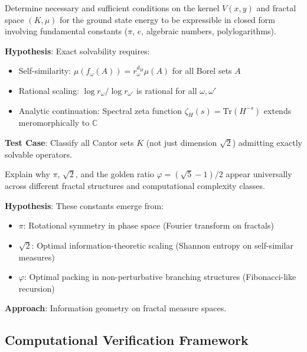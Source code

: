 \begin{problem}\label{prob:exact-solvability}
Determine necessary and sufficient conditions on the kernel $V(x,y)$ and fractal space $(K,\mu)$ for the ground state energy to be expressible in closed form involving fundamental constants ($\pi$, $e$, algebraic numbers, polylogarithms).

\textbf{Hypothesis}: Exact solvability requires:
\begin{itemize}
\item Self-similarity: $\mu(f_\omega(A)) = r_\omega^{d_H}\mu(A)$ for all Borel sets $A$
\item Rational scaling: $\log r_\omega / \log r_{\omega'}$ is rational for all $\omega, \omega'$
\item Analytic continuation: Spectral zeta function $\zeta_H(s) = \text{Tr}(H^{-s})$ extends meromorphically to $\mathbb{C}$
\end{itemize}

\textbf{Test Case}: Classify all Cantor sets $K$ (not just dimension $\sqrt{2}$) admitting exactly solvable operators.
\end{problem}

\begin{problem}\label{prob:universality}
Explain why $\pi$, $\sqrt{2}$, and the golden ratio $\varphi = (\sqrt{5}-1)/2$ appear universally across different fractal structures and computational complexity classes.

\textbf{Hypothesis}: These constants emerge from:
\begin{itemize}
\item \textbf{$\pi$}: Rotational symmetry in phase space (Fourier transform on fractals)
\item \textbf{$\sqrt{2}$}: Optimal information-theoretic scaling (Shannon entropy on self-similar measures)
\item \textbf{$\varphi$}: Optimal packing in non-perturbative branching structures (Fibonacci-like recursion)
\end{itemize}

\textbf{Approach}: Information geometry on fractal measure spaces\cite{ay2017information}.
\end{problem}

\subsection{Computational Verification Framework}

